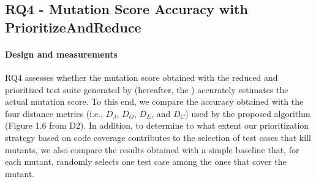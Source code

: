 %

%
%
%


\subsection{RQ4 - Mutation Score Accuracy with PrioritizeAndReduce}
\label{exp:accuracy:prioritize}

\paragraph{Design and measurements}

RQ4 assesses whether the mutation score obtained with the reduced and prioritized test suite generated by \APPR (hereafter, the \MPTS) accurately estimates the actual mutation  score.
To this end, we compare the accuracy obtained with the four distance metrics (i.e., $D_J$, $D_O$, $D_E$, and $D_C$) used by the proposed  algorithm (Figure 1.6 from D2). In addition, to determine to what extent our prioritization strategy based on code coverage contributes to the selection of test cases that kill mutants, we also compare the results obtained with a simple baseline that, for each mutant, randomly selects one test case among the ones that cover the mutant. 


